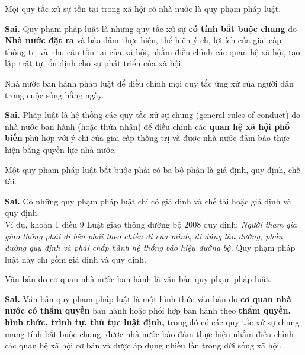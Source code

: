 \begin{ques}
Mọi quy tắc xử sự tồn tại trong xã hội có nhà nước là quy phạm pháp luật.
\end{ques}
\begin{ans}
\textbf{Sai.} Quy phạm pháp luật là những quy tắc xử sự \textbf{có tính bắt buộc chung} do \textbf{Nhà nước đặt ra} và bảo đảm thực hiện, thể hiện ý ch, lợi ích của giai cấp thống trị và nhu cầu tồn tại của xã hội, nhằm điều chỉnh các quan hệ xã hội, tạo lập trật tự, ổn định cho sự phát triển của xã hội.
\end{ans}

\begin{ques}
Nhà nước ban hành pháp luật để điều chỉnh mọi quy tắc ứng xử của người dân trong cuộc sống hằng ngày.
\end{ques}
\begin{ans}
\textbf{Sai.} Pháp luật là hệ thồng các quy tắc xử sự chung (general rules of conduct) do nhà nước ban hành (hoặc thừa nhận) để điều chỉnh các \textbf{quan hệ xã hội phổ biến} phù hợp với ý chí của giai cấp thống trị và được nhà nước đảm bảo thực hiện bằng quyền lực nhà nước. 
\end{ans}

\begin{ques}
Một quy phạm pháp luật bắt buộc phải có ba bộ phận là giả định, quy định, chế tài.
\end{ques}
\begin{ans}
\textbf{Sai.} Có những quy phạm pháp luật chỉ có giả định và chế tài hoặc giả định và quy định.\\
Ví dụ, khoản 1 điều 9 Luật giao thông đường bộ 2008 quy định: \textit{Người tham gia giao thông phải đi bên phải theo chiều đi của mình, đi đúng làn đường, phần đường quy định và phải chấp hành hệ thống báo hiệu đường bộ.} Quy phạm pháp luật này chỉ gồm giả định và quy định.
\end{ans}

\begin{ques}
Văn bản do cơ quan nhà nước ban hành là văn bản quy phạm pháp luật.
\end{ques}
\begin{ans}
\textbf{Sai.} Văn bản quy phạm pháp luật là một hình thức văn bản do \textbf{cơ quan nhà nước có thẩm quyền} ban hành hoặc phối hợp ban hành theo \textbf{thẩm quyền, hình thức, trình tự, thủ tục luật định,} trong đó có các quy tắc xử sự chung mang tính bắt buộc chung, được nhà nước bảo đảm thực hiện nhằm điều chỉnh các quan hệ xã hội cơ bản và được áp dụng nhiều lần trong đời sống xã hội.
\end{ans}

